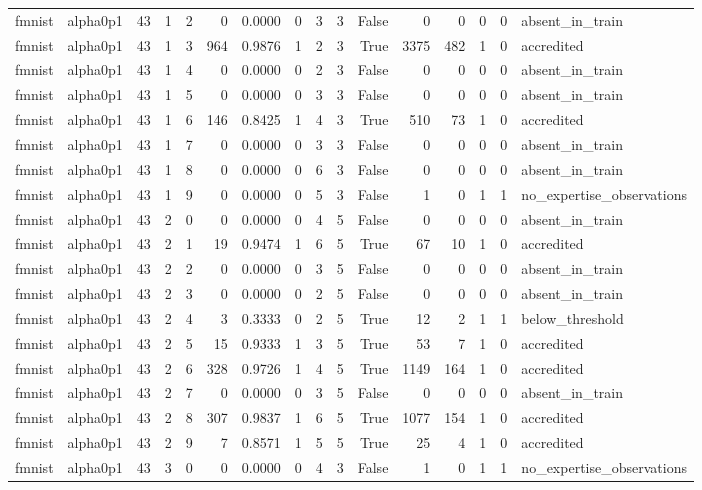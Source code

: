 \begin{tabular}{llrrrrrrrrrrrrrl}
fmnist & alpha0p1 & 43 & 1 & 2 & 0 & 0.0000 & 0 & 3 & 3 & False & 0 & 0 & 0 & 0 & absent\_in\_train \\
fmnist & alpha0p1 & 43 & 1 & 3 & 964 & 0.9876 & 1 & 2 & 3 & True & 3375 & 482 & 1 & 0 & accredited \\
fmnist & alpha0p1 & 43 & 1 & 4 & 0 & 0.0000 & 0 & 2 & 3 & False & 0 & 0 & 0 & 0 & absent\_in\_train \\
fmnist & alpha0p1 & 43 & 1 & 5 & 0 & 0.0000 & 0 & 3 & 3 & False & 0 & 0 & 0 & 0 & absent\_in\_train \\
fmnist & alpha0p1 & 43 & 1 & 6 & 146 & 0.8425 & 1 & 4 & 3 & True & 510 & 73 & 1 & 0 & accredited \\
fmnist & alpha0p1 & 43 & 1 & 7 & 0 & 0.0000 & 0 & 3 & 3 & False & 0 & 0 & 0 & 0 & absent\_in\_train \\
fmnist & alpha0p1 & 43 & 1 & 8 & 0 & 0.0000 & 0 & 6 & 3 & False & 0 & 0 & 0 & 0 & absent\_in\_train \\
fmnist & alpha0p1 & 43 & 1 & 9 & 0 & 0.0000 & 0 & 5 & 3 & False & 1 & 0 & 1 & 1 & no\_expertise\_observations \\
fmnist & alpha0p1 & 43 & 2 & 0 & 0 & 0.0000 & 0 & 4 & 5 & False & 0 & 0 & 0 & 0 & absent\_in\_train \\
fmnist & alpha0p1 & 43 & 2 & 1 & 19 & 0.9474 & 1 & 6 & 5 & True & 67 & 10 & 1 & 0 & accredited \\
fmnist & alpha0p1 & 43 & 2 & 2 & 0 & 0.0000 & 0 & 3 & 5 & False & 0 & 0 & 0 & 0 & absent\_in\_train \\
fmnist & alpha0p1 & 43 & 2 & 3 & 0 & 0.0000 & 0 & 2 & 5 & False & 0 & 0 & 0 & 0 & absent\_in\_train \\
fmnist & alpha0p1 & 43 & 2 & 4 & 3 & 0.3333 & 0 & 2 & 5 & True & 12 & 2 & 1 & 1 & below\_threshold \\
fmnist & alpha0p1 & 43 & 2 & 5 & 15 & 0.9333 & 1 & 3 & 5 & True & 53 & 7 & 1 & 0 & accredited \\
fmnist & alpha0p1 & 43 & 2 & 6 & 328 & 0.9726 & 1 & 4 & 5 & True & 1149 & 164 & 1 & 0 & accredited \\
fmnist & alpha0p1 & 43 & 2 & 7 & 0 & 0.0000 & 0 & 3 & 5 & False & 0 & 0 & 0 & 0 & absent\_in\_train \\
fmnist & alpha0p1 & 43 & 2 & 8 & 307 & 0.9837 & 1 & 6 & 5 & True & 1077 & 154 & 1 & 0 & accredited \\
fmnist & alpha0p1 & 43 & 2 & 9 & 7 & 0.8571 & 1 & 5 & 5 & True & 25 & 4 & 1 & 0 & accredited \\
fmnist & alpha0p1 & 43 & 3 & 0 & 0 & 0.0000 & 0 & 4 & 3 & False & 1 & 0 & 1 & 1 & no\_expertise\_observations \\

\end{tabular}
